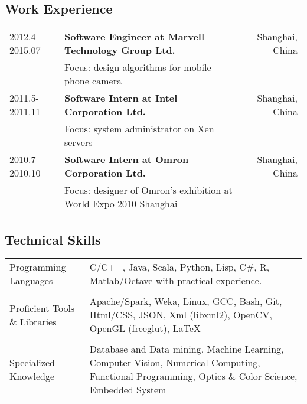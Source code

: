 \documentclass[10pt, a4paper]{article}
\begin{document}
\subsection*{Work Experience}
\label{sec-1-3}
\begin{center}
\begin{tabularx}{\linewidth}{lXr}
2012.4-2015.07 & \textbf{Software Engineer at Marvell Technology Group Ltd.} & Shanghai, China\\
 & Focus: design algorithms for mobile phone camera & \\
2011.5-2011.11 & \textbf{Software Intern at Intel Corporation Ltd.} & Shanghai, China\\
 & Focus: system administrator on Xen servers & \\
2010.7-2010.10 & \textbf{Software Intern at Omron Corporation Ltd.} & Shanghai, China\\
 & Focus: designer of Omron's exhibition at World Expo 2010 Shanghai & \\
\end{tabularx}
\end{center}

\subsection*{Technical Skills}
\label{sec-1-4}
\begin{center}
\begin{tabularx}{\linewidth}{p{1in}X}
Programming Languages & C/C++, Java, Scala, Python, Lisp, C\#, R, Matlab/Octave with practical experience.\\
 & \\
Proficient Tools \& Libraries & Apache/Spark, Weka, Linux, GCC, Bash, Git, Html/CSS, JSON, Xml (libxml2), OpenCV, OpenGL (freeglut), \LaTeX{}\\
 & \\
Specialized Knowledge & Database and Data mining, Machine Learning, Computer Vision, Numerical Computing, Functional Programming, Optics \& Color Science, Embedded System\\
\end{tabularx}
\end{center}
\end{document}
